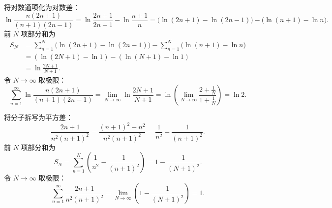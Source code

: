 \begin{myproof}

    将对数通项化为对数差：
    \begin{equation}
        \ln \frac{n(2n+1)}{(n+1)(2n-1)} = \ln\frac{2n+1}{2n-1} - \ln\frac{n+1}{n} = \bigl(\ln(2n+1) - \ln(2n-1)\bigr) - \bigl(\ln(n+1) - \ln n\bigr).
    \end{equation}
    前 $N$ 项部分和为
    \begin{equation}
        \begin{aligned}
            S_N & = \sum_{n=1}^N \bigl(\ln(2n+1) - \ln(2n-1)\bigr) - \sum_{n=1}^N \bigl(\ln(n+1) - \ln n\bigr) \\
                & = (\ln(2N+1) - \ln 1) - (\ln(N+1) - \ln 1)                                                   \\
                & = \ln\frac{2N+1}{N+1}.
        \end{aligned}
    \end{equation}
    令 $N \to \infty$ 取极限：
    \begin{equation}
        \sum_{n=1}^\infty \ln \frac{n(2n+1)}{(n+1)(2n-1)} = \lim_{N\to\infty} \ln\frac{2N+1}{N+1} = \ln\left(\lim_{N\to\infty} \frac{2 + \frac{1}{N}}{1 + \frac{1}{N}}\right) = \ln 2.
    \end{equation}


    将分子拆写为平方差：
    \begin{equation}
        \frac{2n+1}{n^2(n+1)^2} = \frac{(n+1)^2 - n^2}{n^2(n+1)^2} = \frac{1}{n^2} - \frac{1}{(n+1)^2}.
    \end{equation}
    前 $N$ 项部分和为
    \begin{equation}
        S_N = \sum_{n=1}^N \left( \frac{1}{n^2} - \frac{1}{(n+1)^2} \right) = 1 - \frac{1}{(N+1)^2}.
    \end{equation}
    令 $N \to \infty$ 取极限：
    \begin{equation}
        \sum_{n=1}^\infty \frac{2n+1}{n^2(n+1)^2} = \lim_{N\to\infty} \left( 1 - \frac{1}{(N+1)^2} \right) = 1.
    \end{equation}
\end{myproof}

